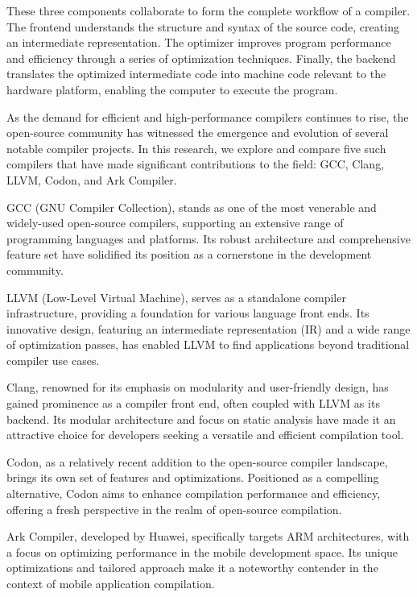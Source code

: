 \documentclass[conference]{IEEEtran}
\begin{document}
These three components collaborate to form the complete workflow of a compiler. The frontend understands the structure and syntax of the source code, creating an intermediate representation. The optimizer improves program performance and efficiency through a series of optimization techniques. Finally, the backend translates the optimized intermediate code into machine code relevant to the hardware platform, enabling the computer to execute the program.

As the demand for efficient and high-performance compilers continues to rise, the open-source community has witnessed the emergence and evolution of several notable compiler projects. In this research, we explore and compare five such compilers that have made significant contributions to the field: GCC, Clang, LLVM, Codon, and Ark Compiler.

GCC (GNU Compiler Collection), stands as one of the most venerable and widely-used open-source compilers, supporting an extensive range of programming languages and platforms. Its robust architecture and comprehensive feature set have solidified its position as a cornerstone in the development community.

LLVM (Low-Level Virtual Machine), serves as a standalone compiler infrastructure, providing a foundation for various language front ends. Its innovative design, featuring an intermediate representation (IR) and a wide range of optimization passes, has enabled LLVM to find applications beyond traditional compiler use cases.

Clang, renowned for its emphasis on modularity and user-friendly design, has gained prominence as a compiler front end, often coupled with LLVM as its backend. Its modular architecture and focus on static analysis have made it an attractive choice for developers seeking a versatile and efficient compilation tool.

Codon, as a relatively recent addition to the open-source compiler landscape, brings its own set of features and optimizations. Positioned as a compelling alternative, Codon aims to enhance compilation performance and efficiency, offering a fresh perspective in the realm of open-source compilation.

Ark Compiler, developed by Huawei, specifically targets ARM architectures, with a focus on optimizing performance in the mobile development space. Its unique optimizations and tailored approach make it a noteworthy contender in the context of mobile application compilation.
\end{document}
